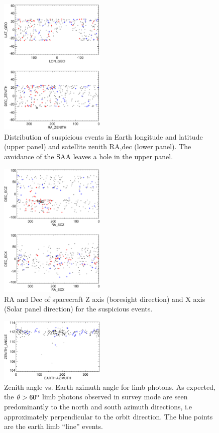 \documentclass[aps,twocolumn,prd,superscriptaddress,showpacs,nofootinbib,fixfloat]{revtex4}
\newcommand{\degree}{^{\rm o}}
\begin{document}
\begin{figure}[p]
\centering
\includegraphics[width=0.45\textwidth]{plots/geo-lonlat.ps}
\caption{Distribution of suspicious events in Earth longitude and latitude
(upper panel) and satellite zenith RA,dec (lower panel).   The
avoidance of the SAA leaves a hole in the upper panel.}
\label{fig:geo-lonlat}
\end{figure}

\begin{figure}[p]
\centering
\includegraphics[width=0.45\textwidth]{plots/spacecraft-zx.ps}
\caption{RA and Dec of spacecraft Z axis (boresight direction) and X axis
(Solar panel direction) for the suspicious events.
}
\label{fig:spacecraft-zx}
\end{figure}

\begin{figure}[p]
\centering
\includegraphics[width=0.45\textwidth]{plots/earth-az.ps}
\caption{Zenith angle vs. Earth azimuth angle for limb photons.  As expected,
  the $\theta > 60\degree$ limb photons observed in survey mode are seen
  predominantly to the north and south azimuth directions, i.e approximately
  perpendicular to the orbit direction. The blue points are the earth limb ``line'' events. }
\label{fig:earth-az}
\end{figure}
\end{document}
